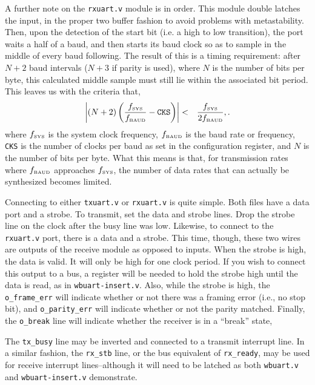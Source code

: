 \documentclass{gqtekspec}
\begin{document}
A further note on the {\tt rxuart.v} module is in order.  This module double
latches the input, in the proper two buffer fashion to avoid problems with
metastability.  Then, upon the detection of the start bit (i.e. a high to low
transition), the port waits a half of a baud, and then starts its baud clock
so as to sample in the middle of every baud following.  The result of this is
a timing requirement: after $N+2$ baud intervals ($N+3$ if parity is used),
where $N$ is the number of bits per byte, this calculated middle sample must
still lie within the associated bit period.  This leaves us with the criteria
that,
\begin{eqnarray}
\left|\left(N+2\right)
	\left(\frac{f_{\mbox{\tiny SYS}}}{f_{\mbox{\tiny BAUD}}}
		-{\mbox{\tt CKS}}\right)\right|
	&<& \frac{f_{\mbox{\tiny SYS}}}{2f_{\mbox{\tiny BAUD}}},
	\label{eqn:baudlimit}.
\end{eqnarray}
where $f_{\mbox{\tiny SYS}}$ is the system clock frequency,
$f_{\mbox{\tiny BAUD}}$ is the baud rate or frequency,
{\tt CKS} is the number of clocks per baud as set in the configuration
register, and $N$ is the number of bits per byte.  What this means is that,
for transmission rates where $f_{\mbox{\tiny BAUD}}$ approaches
$f_{\mbox{\tiny SYS}}$, the number of data rates that can actually be
synthesized becomes limited.

Connecting to either {\tt txuart.v} or {\tt rxuart.v} is quite simple.  Both
files have a data port and a strobe.  To transmit, set the data and strobe
lines.  Drop the strobe line on the clock after the busy line was low.
Likewise, to connect to the {\tt rxuart.v} port, there is a data
and a strobe.  This time, though, these two wires are outputs of the receive
module as opposed to inputs.
When the strobe is high, the data is valid.  It will only be high for one
clock period.  If you wish to connect this output to a bus, a register will be
needed to hold the strobe high until the data is read, as in
{\tt wbuart-insert.v}.  Also, while the strobe
is high, the {\tt o\_frame\_err} will indicate whether or not there was a
framing error (i.e., no stop bit), and {\tt o\_parity\_err} will indicate
whether or not the parity matched.  Finally, the {\tt o\_break} line will
indicate whether the receiver is in a ``break'' state,

The {\tt tx\_busy} line may be inverted and connected to a transmit interrupt
line.  In a similar fashion, the {\tt rx\_stb} line, or the bus equivalent of
{\tt rx\_ready}, may be used for receive interrupt lines--although it will need
to be latched as both {\tt wbuart.v} and {\tt wbuart-insert.v} demonstrate.
\end{document}
